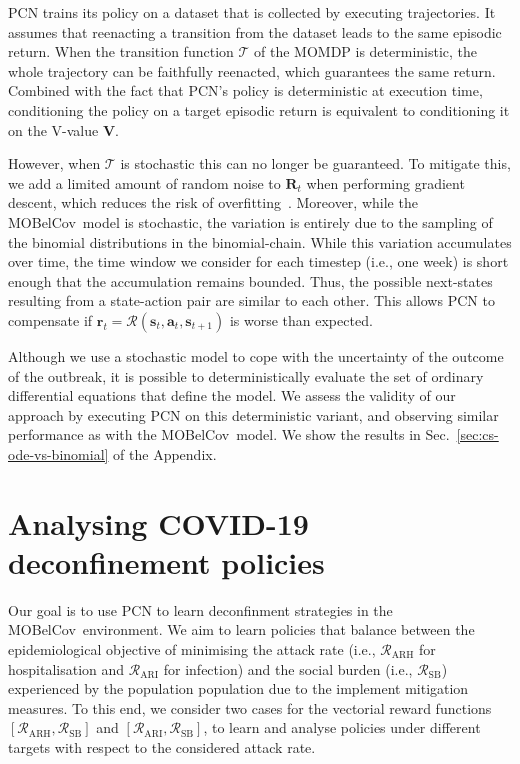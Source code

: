 \documentclass{article}
\renewcommand{\cite}[1]{\citep{#1}}
\newcommand{\mdptransition}{\mathcal{T}}
\newcommand{\mdprewardfn}{\mathcal{R}}
\newcommand{\momdprewardfn}{\bm{\mathcal{R}}}
\newcommand{\mdpstate}{\mathbf{s}}
\newcommand{\momdpreward}{\mathbf{r}}
\newcommand{\mdpaction}{\mathbf{a}}
\newcommand{\momdpname}{MOBelCov}
\begin{document}
PCN trains its policy on a dataset that is collected by executing trajectories. It assumes that reenacting a transition from the dataset leads to the same episodic return. When the transition function $\mathcal{T}$ of the MOMDP is deterministic, the whole trajectory can be faithfully reenacted, which guarantees the same return. Combined with the fact that PCN's policy is deterministic at execution time, conditioning the policy on a target episodic return is equivalent to conditioning it on the V-value $\mathbf{V}$.

However, when $\mdptransition$ is stochastic this can no longer be guaranteed. To mitigate this, we add a limited amount of random noise to $\mathbf{R}_t$ when performing gradient descent, which reduces the risk of overfitting~\cite{zur2009noise}. Moreover, while the \momdpname\ model is stochastic, the variation is entirely due to the sampling of the binomial distributions in the binomial-chain. While this variation accumulates over time, the time window we consider for each timestep (i.e., one week) is short enough that the accumulation remains bounded. Thus, the possible next-states resulting from a state-action pair are similar to each other. This allows PCN to compensate if $\momdpreward_t = \momdprewardfn(\mdpstate_t, \mdpaction_t, \mdpstate_{t+1})$ is worse than expected.

Although we use a stochastic model to cope with the uncertainty of the outcome of the outbreak, it is possible to deterministically evaluate the set of ordinary differential equations that define the model. We assess the validity of our approach by executing PCN on this deterministic variant, and observing similar performance as with the \momdpname\ model. We show the results in Sec.~\ref{sec:cs-ode-vs-binomial} of the Appendix.

\section{Analysing COVID-19 deconfinement policies}
\label{sec:experiments}
Our goal is to use PCN to learn deconfinment strategies in the \momdpname\ environment. We aim to learn policies that balance between the epidemiological objective of minimising the attack rate (i.e., $\mdprewardfn_\text{ARH}$ for hospitalisation and $\mdprewardfn_\text{ARI}$ for infection) and the social burden (i.e., $\mdprewardfn_\text{SB}$) experienced by the population population due to the implement mitigation measures. To this end, we consider two cases for the vectorial reward functions $[\mdprewardfn_\text{ARH}, \mdprewardfn_\text{SB}]$ and $[\mdprewardfn_\text{ARI}, \mdprewardfn_\text{SB}]$, to learn and analyse policies under different targets with respect to the considered attack rate.
\end{document}
